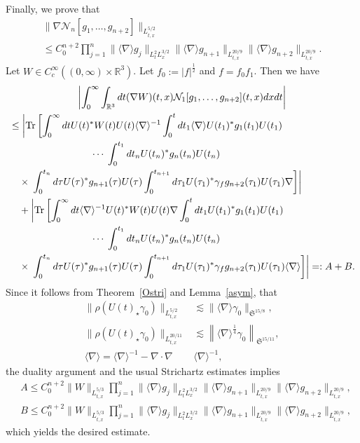 \documentclass[AHL,Unicode,longabstracts,MathTools,published]{cedram}
\newcommand{\BR}{\mathbb{R}}
\newcommand{\CN}{\mathcal{N}}
\newcommand{\FS}{\mathfrak{S}}
\newcommand{\ga}{\gamma}
\newcommand{\ta}{\tau}
\newcommand{\rh}{\rho}
\newcommand{\abs}[1]{\left|#1\right|}
\newcommand{\I}{\infty}
\DeclareMathOperator{\Tr}{Tr}
\newcommand{\sd}{\langle \nabla \rangle}
\newcommand{\sdi}{\sd^{-1}}
\newcommand{\tx}{{t,x}}
\newcommand{\st}{\star}
\newcommand{\ft}{{\frac{1}{4}}}
\newcommand{\R}{\mathbb{R}}
\newcommand{\tw}{\frac{1}{2}}
\newcommand{\na}{\nabla}
\newcommand{\ls}{\lesssim}
\begin{document}
Finally, we prove that
\begin{multline}\label{eq:with deriv}
\|\na \CN_n[g_1,\dots,g_{n+2}]\|_{L^{5/2}_\tx}
\\
\le C_0^{n+2} \prod_{j=1}^{n} \|\sd g_j\|_{L^2_t L^{3/2}_x} \|\sd g_{n+1}\|_{L^{20/9}_\tx} \|\sd g_{n+2}\|_{L^{20/9}_\tx}.
\end{multline}
Let $W \in C_c^\I((0,\I)\times \BR^3)$. Let $f_0 := |f|^\tw$ and $f = f_0 f_1$. Then we have
\begin{multline}
\abs{\int_0^\I \int_{\R^3} dt (\na W)(t,x) \CN_1 [g_1,\dots,g_{n+2}](t,x) dx dt } \\
\begin{aligned}
&\le \left| \Tr \left[\int_0^\I dt U(t)^* W(t) U(t) \sdi
\int_0^tdt_1 \sd U(t_1)^* g_1(t_1) U(t_1)\right.\right.
\\
&\mkern150mu\cdots\left.\left.
\int_0^{t_1} dt_n U(t_n)^* g_n(t_n) U(t_n)
\right. \right. \\
&\quad \times\left. \left.
\int_0^{t_n} d\ta U(\ta)^* g_{n+1}(\ta) U(\ta)
\int_0^{t_{n+1}} d\ta_1 U(\ta_1)^* \ga_f g_{n+2}(\ta_1) U(\ta_1)\na \right] \right| \\
&\quad + \left| \Tr \left[\int_0^\I dt \sdi U(t)^* W(t) U(t)
\na \int_0^tdt_1 U(t_1)^* g_1(t_1) U(t_1)\right.\right.\\
&\mkern150mu\cdots\left.\left.
\int_0^{t_1} dt_n U(t_n)^* g_n(t_n) U(t_n)
\right. \right. \\
&\quad\times\left. \left. 
\int_0^{t_n} d\ta U(\ta)^* g_{n+1}(\ta) U(\ta)
\int_0^{t_{n+1}} d\ta_1 U(\ta_1)^* \ga_f g_{n+2}(\ta_1) U(\ta_1)\sd \right] \right|=:A + B.
\end{aligned}
\end{multline}
Since it follows from Theorem~\ref{Ostri} and Lemma~\ref{asym}, that
\begin{align}
\|\rh(U(t)_\st \ga_0)\|_{L^{5/2}_\tx} &\ls \|\sd \ga_0\|_{\FS^{15/8}}, \\
\|\rh(U(t)_\st \ga_0)\|_{L^{20/11}_\tx} &\ls \left\|\sd^{\ft} \ga_0\right\|_{\FS^{15/11}}, \\
\sd = \sdi - \na\cdot\na &\sdi,
\end{align}
the duality argument and the usual Strichartz estimates implies
\begin{align}
&A \le C_0^{n+2} \|W\|_{L^{5/3}_\tx}\prod_{j=1}^{n} \|\sd g_j\|_{L^2_t L^{3/2}_x} \|\sd g_{n+1}\|_{L^{20/9}_\tx} \|\sd g_{n+2}\|_{L^{20/9}_\tx}, \\
&B \le C_0^{n+2} \|W\|_{L^{5/3}_\tx} \prod_{j=1}^{n} \|\sd g_j\|_{L^2_t L^{3/2}_x} \|\sd g_{n+1}\|_{L^{20/9}_\tx} \|\sd g_{n+2}\|_{L^{20/9}_\tx},
\end{align}
which yields the desired estimate.
\end{document}
